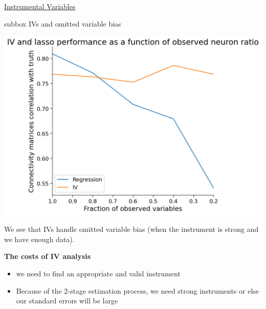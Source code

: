 \begin{textbox}{\href{https://compneuro.neuromatch.io/tutorials/W3D5_NetworkCausality/student/W3D5_Tutorial4.html}{Instrumental Variables }   }
\begin{subbox}{subbox}{ IVs and omitted variable bias
}
\begin{center}
\includegraphics[scale=0.2]{Figures/NC/NC_Figure23.png}

\end{center}

We see that IVs handle omitted variable bias (when the instrument is strong and we have enough data).

\textbf{The costs of IV analysis}
\begin{itemize}
    

\item  we need to find an appropriate and valid instrument
\item  Because of the 2-stage estimation process, we need strong instruments or else our standard errors will be large
\end{itemize}
\end{subbox}
\end{textbox}
